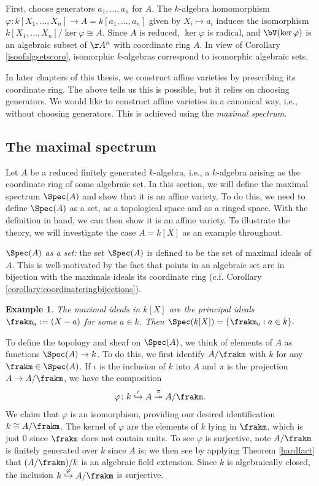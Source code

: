\documentclass[12pt]{amsart}
\theoremstyle{plain}
\newtheorem{example}[theorem]{Example}
\begin{document}
First, choose generators $a_1, \ldots, a_n$ for $A$.
The $k$-algebra homomorphism $\varphi : k[X_1, \ldots, X_n] \to A=k[a_1,\ldots,a_n]$ given by $X_i \mapsto a_i$ induces the isomorphism $k[X_1, \ldots, X_n] / \ker \varphi \cong A$.
Since $A$ is reduced, $\ker\varphi$ is radical, and $\bV(\ker \varphi)$ is an algebraic subset of $\AA^n$ with coordinate ring $A$.
In view of Corollary \ref{isoofalgsetscoro}, isomorphic $k$-algebras correspond to isomorphic algebraic sets.

In later chapters of this thesis, we construct affine varieties by prescribing its coordinate ring.
The above tells us this is possible, but it relies on choosing generators.
We would like to construct affine varieties in a canonical way, i.e., without choosing generators.
This is achieved using the \emph{maximal spectrum}.





\subsection{The maximal spectrum}\label{section:themaximalspectrum}
Let $A$ be a reduced finitely generated $k$-algebra, i.e., a $k$-algebra arising as the coordinate ring of some algebraic set.
In this section, we will define the maximal spectrum $\Spec(A)$ and show that it is an affine variety.
To do this, we need to define $\Spec(A)$ as a set, as a topological space and as a ringed space.
With the definition in hand, we can then show it is an affine variety.
To illustrate the theory, we will investigate the case $A=k[X]$ as an example throughout.

\emph{$\Spec(A)$ as a set:}
the set $\Spec(A)$ is defined to be the set of maximal ideals of $A$.
This is well-motivated by the fact that points in an algebraic set are in bijection with the maximals ideals its coordinate ring (c.f. Corollary \ref{corollary:coordinateringbijections}).

\begin{example}
The maximal ideals in $k[X]$ are the principal ideals $\frakm_a:=(X-a)$ for some $a\in k$.
Then $\Spec(k[X]) = \{\frakm_a : a \in k\}.$
\end{example}

To define the topology and sheaf on $\Spec(A)$, we think of elements of $A$ as functions $\Spec(A) \to k$.
To do this, we first identify $A/\frakm$ with $k$ for any $\frakm \in \Spec(A)$.
If $\iota$ is the inclusion of $k$ into $A$ and $\pi$ is the projection $A \to A/\frakm$, we have the composition
$$\varphi \colon k \overset{\iota}{\hookrightarrow} A \overset{\pi}{\twoheadrightarrow} A/\frakm.$$
We claim that $\varphi$ is an isomorphism, providing our desired identification $k \cong A/\frakm$.
The kernel of $\varphi$ are the elements of $k$ lying in $\frakm$, which is just $0$ since $\frakm$ does not contain units.
To see $\varphi$ is surjective, note $A/\frakm$ is finitely generated over $k$ since $A$ is;
we then see by applying Theorem \ref{hardfact} that $(A/\frakm)/k$ is an algebraic field extension.
Since $k$ is algebraically closed, the inclusion $k \overset{\varphi}{\hookrightarrow} A/\frakm$ is surjective.
\end{document}

